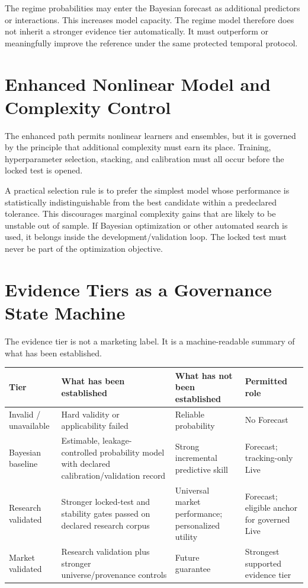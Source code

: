 \documentclass[11pt]{article}
\begin{document}
The regime probabilities may enter the Bayesian forecast as additional predictors or interactions. This increases model capacity. The regime model therefore does not inherit a stronger evidence tier automatically. It must outperform or meaningfully improve the reference under the same protected temporal protocol.

\section{Enhanced Nonlinear Model and Complexity Control}
The enhanced path permits nonlinear learners and ensembles, but it is governed by the principle that additional complexity must earn its place. Training, hyperparameter selection, stacking, and calibration must all occur before the locked test is opened.

A practical selection rule is to prefer the simplest model whose performance is statistically indistinguishable from the best candidate within a predeclared tolerance. This discourages marginal complexity gains that are likely to be unstable out of sample. If Bayesian optimization or other automated search is used, it belongs inside the development/validation loop. The locked test must never be part of the optimization objective.

\section{Evidence Tiers as a Governance State Machine}
The evidence tier is not a marketing label. It is a machine-readable summary of what has been established.

\begin{longtable}{p{}p{}p{}p{}}
\toprule
Tier & What has been established & What has not been established & Permitted role\\
\midrule
Invalid / unavailable & Hard validity or applicability failed & Reliable probability & No Forecast\\
Bayesian baseline & Estimable, leakage-controlled probability model with declared calibration/validation record & Strong incremental predictive skill & Forecast; tracking-only Live\\
Research validated & Stronger locked-test and stability gates passed on declared research corpus & Universal market performance; personalized utility & Forecast; eligible anchor for governed Live\\
Market validated & Research validation plus stronger universe/provenance controls & Future guarantee & Strongest supported evidence tier\\
\bottomrule
\end{longtable}
\end{document}
